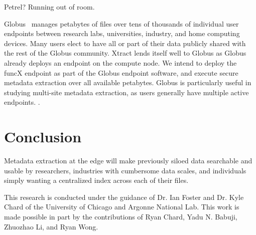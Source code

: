 \documentclass[sigconf]{acmart}
\newcommand{\tyler}[1]{}
\newcommand{\kyle}[1]{}
\newcommand{\tyler}[1]{{\textcolor{cyan}{ tyler: #1 }}}
\newcommand{\kyle}[1]{{\textcolor{purple}{ Kyle: #1 }}}
\begin{document}
Petrel? Running out of room. 

Globus~\cite{ananthakrishnan2018globus} manages petabytes of files over tens of thousands of individual user endpoints between research labs, 
universities, industry, and home computing devices. Many \tyler{???} users elect to have all or part of their data publicly 
shared with the rest of the Globus community. \kyle{private sharing could also be indexed} Xtract lends itself well to Globus as Globus already deploys an 
endpoint on the compute node.  We intend to deploy the funcX endpoint as part of the Globus endpoint software, and 
execute secure metadata extraction over all available petabytes. Globus is particularly useful in studying multi-site 
metadata extraction, as users generally have multiple active endpoints. \tyler{more detail}. 



\section{Conclusion}
\label{sec:conc}

Metadata extraction at the edge will make previously siloed data searchable and usable by researchers, 
industries with cumbersome data scales, and individuals simply wanting a centralized index across 
each of their files. 


\begin{acks}

This research is conducted under the guidance of Dr. Ian Foster and Dr. Kyle Chard of the 
University of Chicago and Argonne National Lab. This work is made possible in part by the contributions
of Ryan Chard, Yadu N. Babuji, Zhuozhao Li, and Ryan Wong. 


\end{acks}


\end{document}
